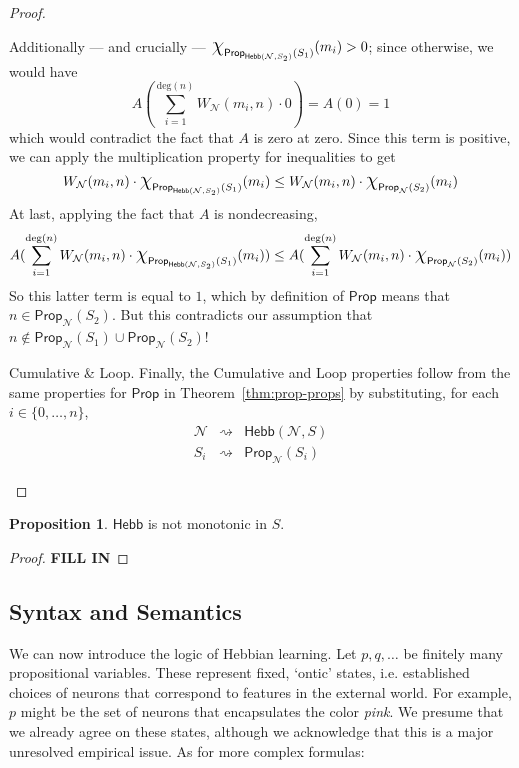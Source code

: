 \documentclass[letterpaper]{article}
\theoremstyle{definition}
\newtheorem{proposition}{Proposition}
\newcommand{\set}[1]{\{ #1 \}}
\newcommand*{\bigchi}{\mbox{\Large$\chi$}}%
\newcommand{\degree}[1]{\mathrm{deg}(#1)}
\newcommand{\Prop}{\textsf{Prop}}
\newcommand{\Hebb}{\textsf{Hebb}}
\newcommand{\Net}{\mathcal{N}}
\begin{document}
\begin{proof}
\begin{compactdesc}
\begin{compactdesc}
        Additionally --- and crucially --- $\bigchi_{\Prop_{\Hebb(\Net, S_2)}(S_1)}(m_i) > 0$; since otherwise, we would have
        \[
            A(\sum_{i=1}^{\degree{n}} W_{\Net}(m_i, n) \cdot 0) = A(0) = 1
        \]
        which would contradict the fact that $A$ is zero at zero.  Since this term is positive, we can apply the multiplication property for inequalities to get
        \[
            W_\Net(m_i, n) \cdot \bigchi_{\Prop_{\Hebb(\Net, S_2)}(S_1)}(m_i) \leq
            W_\Net(m_i, n) \cdot \bigchi_{\Prop_{\Net}(S_2)}(m_i)
        \]
        At last, applying the fact that $A$ is nondecreasing,
        \[
            A(\sum_{i=1}^{\degree{n}} W_{\Net}(m_i, n) \cdot \bigchi_{\Prop_{\Hebb(\Net, S_2)}(S_1)}(m_i)) \leq
            A(\sum_{i=1}^{\degree{n}} W_{\Net}(m_i, n) \cdot \bigchi_{\Prop_{\Net}(S_2)}(m_i))
        \]
        So this latter term is equal to $1$, which by definition of $\Prop$ means that $n \in \Prop_{\Net}(S_2)$.  But this contradicts our assumption that $n \not \in \Prop_{\Net}(S_1) \cup \Prop_{\Net}(S_2)$!

        
    \end{compactdesc}
    
    \item[Cumulative \& Loop.] Finally, the Cumulative and Loop properties follow from the same properties for $\Prop$ in Theorem~\ref{thm:prop-props} by substituting, for each $i \in \set{0, \ldots, n}$,
    \[
    \begin{array}{lcl}
    \Net & \rightsquigarrow & \Hebb(\Net, S)\\
    S_i & \rightsquigarrow & \Prop_\Net(S_i)
    \end{array}
    \] \qedhere
\end{compactdesc}
\end{proof}

\begin{proposition}
$\Hebb$ is not monotonic in $S$.
\end{proposition}  
\begin{proof}
\textbf{\textcolor{myred}{FILL IN}}
\end{proof}

\subsection{Syntax and Semantics}

We can now introduce the logic of Hebbian learning.  Let $p, q, \ldots$ be finitely many propositional variables.  These represent fixed, `ontic' states, i.e. established choices of neurons that correspond to features in the external world.  For example, $p$ might be the set of neurons that encapsulates the color \emph{pink}.  We presume that we already agree on these states, although we acknowledge that this is a major unresolved empirical issue.  As for more complex formulas:
\end{document}
